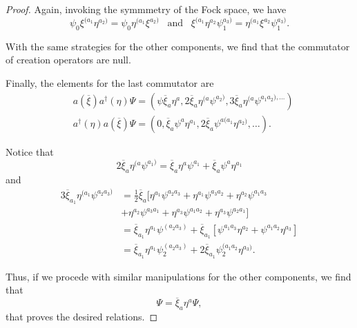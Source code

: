 \begin{proof}
    Again, invoking the symmmetry of the Fock space, we have
    \begin{equation}
        \psi_0\xi^{(a_1}\eta^{a_2)}=\psi_0\eta^{(a_1}\xi^{a_2)}\;\;\;\text{and}\;\;\;\xi^{(a_1}\eta^{a_2}\psi_1^{a_3)}=\eta^{(a_1}\xi^{a_2}\psi_1^{a_3)}.
    \end{equation}

    With the same strategies for the other components, we find that the commutator of creation operators are null.

    Finally, the elements for the last commutator are
    \begin{subequations}
        \begin{align}
            &a(\overline{\xi})a^{\dagger}(\eta)\Psi=\left(\psi\overline{\xi}_a\eta^a,2\overline{\xi}_a\eta^{(a}\psi^{a_2)},3\overline{\xi}_a\eta^{(a}\psi^{a_1a_2),\dots}\right)\\
            &a^{\dagger}(\eta)a(\overline{\xi})\Psi=\left(0,\overline{\xi}_a\psi^a\eta^{a_1},2\overline{\xi}_a\psi^{a(a_1}\eta^{a_2)},\dots\right).
        \end{align}
    \end{subequations}

    Notice that
    \begin{equation}
        2\overline{\xi}_a\eta^{(a}\psi^{a_1)}=\overline{\xi}_a\eta^a\psi^{a_1}+\overline{\xi}_a\psi^a\eta^{a_1}
    \end{equation}
    and
    \begin{subequations}
        \begin{align}
            3\overline{\xi}_{a_1}\eta^{(a_1}\psi^{a_2a_3)}&=\frac{1}{2}\overline{\xi}_a[\eta^{a_1}\psi^{a_2a_3}+\eta^{a_1}\psi^{a_3a_2}+\eta^{a_2}\psi^{a_1a_3}\\
            &+\eta^{a_2}\psi^{a_3a_1}+\eta^{a_3}\psi^{a_1a_2}+\eta^{a_3}\psi^{a_2a_1}]\\
            &=\overline{\xi}_{a_1}\eta^{a_1}\psi^{(a_2a_3)}+\overline{\xi}_{a_1}\left[\psi^{a_1a_3}\eta^{a_2}+\psi^{a_1a_2}\eta^{a_3}\right]\\
            &=\overline{\xi}_{a_1}\eta^{a_1}\psi_2^{(a_2a_3)}+2\overline{\xi}_{a_1}\psi_2^{(a_1a_2}\eta^{a_3)}.
        \end{align}
    \end{subequations}

    Thus, if we procede with similar manipulations for the other components, we find that
    \begin{equation}
        [a(\overline{\xi}),a^{\dagger}(\eta)]\Psi=\overline{\xi}_a\eta^a\Psi,
    \end{equation}
    that proves the desired relations.
\end{proof}